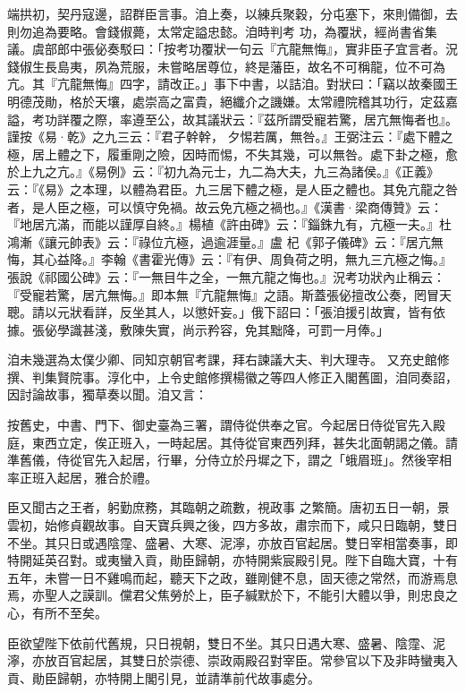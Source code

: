 \begin{pinyinscope}
 端拱初，契丹寇邊，詔群臣言事。洎上奏，以練兵聚穀，分屯塞下，來則備御，去則勿追為要略。會錢俶薨，太常定謚忠懿。洎時判考
 功，為覆狀，經尚書省集議。虞部郎中張佖奏駁曰：「按考功覆狀一句云『亢龍無悔』，實非臣子宜言者。況錢俶生長島夷，夙為荒服，未嘗略居尊位，終是藩臣，故名不可稱龍，位不可為亢。其『亢龍無悔』四字，請改正。」事下中書，以詰洎。對狀曰：「竊以故秦國王明德茂勛，格於天壤，處崇高之富貴，絕纖介之譏嫌。太常禮院稽其功行，定茲嘉謚，考功詳覆之際，率遵至公，故其議狀云：『茲所謂受寵若驚，居亢無悔者也』。謹按《易·乾》之九三云：『君子幹幹，
 夕惕若厲，無咎。』王弼注云：『處下體之極，居上體之下，履重剛之險，因時而惕，不失其幾，可以無咎。處下卦之極，愈於上九之亢。』《易例》云：『初九為元士，九二為大夫，九三為諸侯。』《正義》云：『《易》之本理，以體為君臣。九三居下體之極，是人臣之體也。其免亢龍之咎者，是人臣之極，可以慎守免禍。故云免亢極之禍也。』《漢書·梁商傳贊》云：『地居亢滿，而能以謹厚自終。』楊植《許由碑》云：『錙銖九有，亢極一夫。』杜鴻漸《讓元帥表》云：『祿位亢極，過逾涯量。』盧
 杞《郭子儀碑》云：『居亢無悔，其心益降。』李翰《書霍光傳》云：『有伊、周負荷之明，無九三亢極之悔。』張說《祁國公碑》云：『一無目牛之全，一無亢龍之悔也。』況考功狀內止稱云：『受寵若驚，居亢無悔。』即本無『亢龍無悔』之語。斯蓋張佖擅改公奏，罔冒天聰。請以元狀看詳，反坐其人，以懲奸妄。」俄下詔曰：「張洎援引故實，皆有依據。張佖學識甚淺，敷陳失實，尚示矜容，免其黜降，可罰一月俸。」



 洎未幾選為太僕少卿、同知京朝官考課，拜右諫議大夫、判大理寺。
 又充史館修撰、判集賢院事。淳化中，上令史館修撰楊徽之等四人修正入閣舊圖，洎同奏詔，因討論故事，獨草奏以聞。洎又言：



 按舊史，中書、門下、御史臺為三署，謂侍從供奉之官。今起居日侍從官先入殿庭，東西立定，俟正班入，一時起居。其侍從官東西列拜，甚失北面朝謁之儀。請準舊儀，侍從官先入起居，行畢，分侍立於丹墀之下，謂之「蛾眉班」。然後宰相率正班入起居，雅合於禮。



 臣又聞古之王者，躬勤庶務，其臨朝之疏數，視政事
 之繁簡。唐初五日一朝，景雲初，始修貞觀故事。自天寶兵興之後，四方多故，肅宗而下，咸只日臨朝，雙日不坐。其只日或遇陰霪、盛暑、大寒、泥濘，亦放百官起居。雙日宰相當奏事，即特開延英召對。或夷蠻入貢，勛臣歸朝，亦特開紫宸殿引見。陛下自臨大寶，十有五年，未嘗一日不雞鳴而起，聽天下之政，雖剛健不息，固天德之常然，而游焉息焉，亦聖人之謨訓。儻君父焦勞於上，臣子緘默於下，不能引大體以爭，則忠良之心，有所不至矣。



 臣欲望陛下依前代舊規，只日視朝，雙日不坐。其只日遇大寒、盛暑、陰霪、泥濘，亦放百官起居，其雙日於崇德、崇政兩殿召對宰臣。常參官以下及非時蠻夷入貢、勛臣歸朝，亦特開上閣引見，並請準前代故事處分。




\end{pinyinscope}
